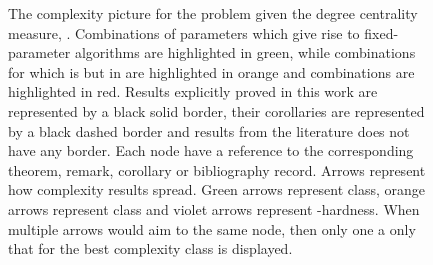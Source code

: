 \begin{figure}[t]
    \caption{
        The complexity picture for the \HL problem given the degree centrality measure, \HLdeg.
        Combinations of parameters which give rise to fixed-parameter algorithms are highlighted in green,
        while combinations for which \HLdeg is \Wh but in \XP are highlighted in orange and \pNP combinations
        are highlighted in red.
        Results explicitly proved in this work are represented by a black solid border,
        their corollaries are represented by a black dashed border and
        results from the literature does not have any border.
        Each node have a reference to the corresponding theorem, remark, corollary or bibliography record.
        Arrows represent how complexity results spread.
        Green arrows represent \FPT class, orange arrows represent \XP class
        and violet arrows represent \W-hardness.
        When multiple arrows would aim to the same node, then only one a only that for the best complexity class is displayed.  
    }
    \label{fig:complexityPicture}
\end{figure}
